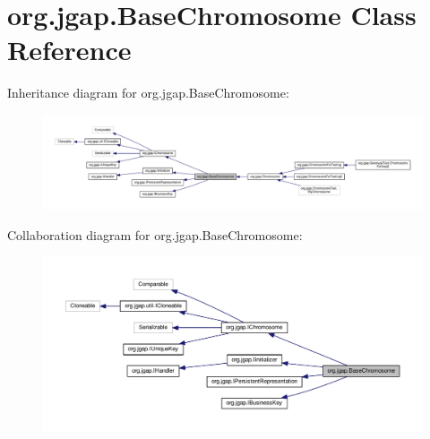 \hypertarget{classorg_1_1jgap_1_1_base_chromosome}{\section{org.\-jgap.\-Base\-Chromosome Class Reference}
\label{classorg_1_1jgap_1_1_base_chromosome}
}


Inheritance diagram for org.\-jgap.\-Base\-Chromosome\-:
\nopagebreak
\begin{figure}[H]
\begin{center}
\leavevmode
\includegraphics[width=350pt]{classorg_1_1jgap_1_1_base_chromosome__inherit__graph}
\end{center}
\end{figure}


Collaboration diagram for org.\-jgap.\-Base\-Chromosome\-:
\nopagebreak
\begin{figure}[H]
\begin{center}
\leavevmode
\includegraphics[width=350pt]{classorg_1_1jgap_1_1_base_chromosome__coll__graph}
\end{center}
\end{figure}
